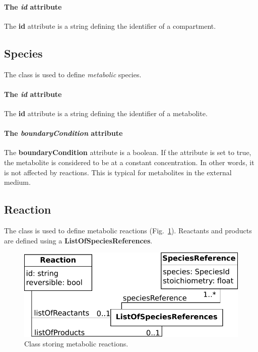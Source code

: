 \paragraph{The \textit{id} attribute}
The \textbf{id} attribute is a string defining the identifier of a compartment.


\subsection{Species}
\label{sec:species}

The \species{} class is used to define \emph{metabolic} species.

\paragraph{The \textit{id} attribute}
The \textbf{id} attribute is a string defining the identifier of a metabolite.

\paragraph{The \textit{boundaryCondition} attribute}
The \textbf{boundaryCondition} attribute is a boolean.
If the attribute is set to true, the metabolite is considered to be at
a constant concentration.
In other words, it is not affected by reactions.
This is typical for metabolites in the external medium.


\subsection{Reaction}
\label{sec:reaction}

The \reaction{} class is used to define metabolic reactions
(Fig.~\ref{fig:metabolism_reaction}).
Reactants and products are defined using a \textbf{ListOfSpeciesReferences}.

\begin{figure}
  \centering
  \includegraphics[scale=0.9]{figures/metabolism_reaction}
  \caption{Class storing metabolic reactions.}
\label{fig:metabolism_reaction}
\end{figure}

